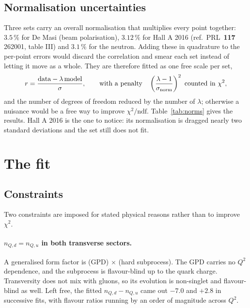 \documentclass[11pt,a4paper]{article}
\begin{document}
\subsection{Normalisation uncertainties}

Three sets carry an overall normalisation that multiplies every point together:
$3.5\,\%$ for De Masi (beam polarisation), $3.12\,\%$ for Hall A 2016
(ref.~PRL~\textbf{117} 262001, table III) and $3.1\,\%$ for the neutron.  Adding
these in quadrature to the per-point errors would discard the correlation and
smear each set instead of letting it move as a whole.  They are therefore
fitted as one free scale per set,
\begin{equation}
r = \frac{\text{data} - \lambda\,\text{model}}{\sigma},
\qquad\text{with a penalty}\quad \left(\frac{\lambda-1}{\sigma_{\rm norm}}\right)^2
\ \text{counted in }\chi^2,
\end{equation}
and the number of degrees of freedom reduced by the number of $\lambda$;
otherwise a nuisance would be a free way to improve $\chi^2/\mathrm{ndf}$.
Table~\ref{tab:norms} gives the results.  Hall A 2016 is the one to notice: its
normalisation is dragged nearly two standard deviations and the set still does
not fit.

\begin{table}[htb]
\centering\small
\caption{Fitted normalisations.}
\label{tab:norms}

\end{table}

\section{The fit}

\subsection{Constraints}

Two constraints are imposed for stated physical reasons rather than to improve
$\chi^2$.

\paragraph{$n_{Q,d} = n_{Q,u}$ in both transverse sectors.}  A generalised form
factor is (GPD) $\times$ (hard subprocess).  The GPD carries no $Q^2$
dependence, and the subprocess is flavour-blind up to the quark charge.
Transversity does not mix with gluons, so its evolution is non-singlet and
flavour-blind as well.  Left free, the fitted $n_{Q,d} - n_{Q,u}$ came out
$-7.0$ and $+2.8$ in successive fits, with flavour ratios running by an order
of magnitude across $Q^2$.
\end{document}
